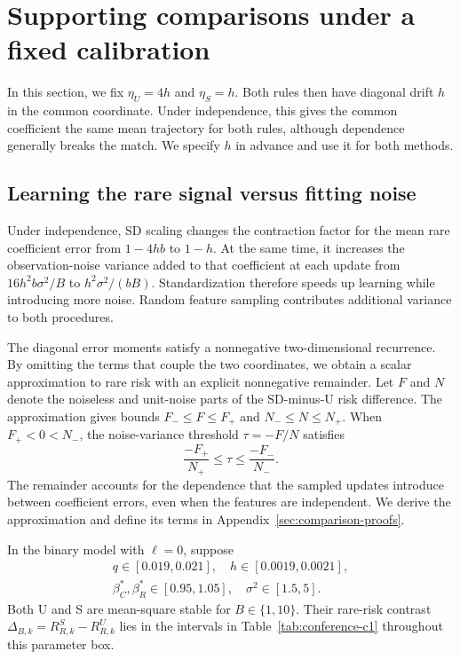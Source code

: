 \section{Supporting comparisons under a fixed calibration}
\label{sec:conference-comparisons}

In this section, we fix $\eta_U = 4h$ and $\eta_S = h$. Both rules then have
diagonal drift $h$ in the common coordinate. Under independence, this gives the
common coefficient the same mean trajectory for both rules, although dependence
generally breaks the match. We specify $h$ in advance and use it for both
methods.

\subsection{Learning the rare signal versus fitting noise}

Under independence, SD scaling changes the contraction factor for the mean rare
coefficient error from $1 - 4hb$ to $1 - h$. At the same time, it increases the
observation-noise variance added to that coefficient at each update from
$16h^2b\sigma^2/B$ to $h^2\sigma^2/(bB)$. Standardization therefore speeds up
learning while introducing more noise. Random feature sampling contributes
additional variance to both procedures.

The diagonal error moments satisfy a nonnegative two-dimensional recurrence. By
omitting the terms that couple the two coordinates, we obtain a scalar
approximation to rare risk with an explicit nonnegative remainder. Let $F$ and
$N$ denote the noiseless and unit-noise parts of the SD-minus-U risk difference.
The approximation gives bounds
$F_- \leq F \leq F_+$ and $N_- \leq N \leq N_+$. When $F_+ < 0 < N_-$, the
noise-variance threshold $\tau = -F/N$ satisfies
\begin{equation}
 \frac{-F_+}{N_+} \leq \tau
                  \leq \frac{-F_-}{N_-}. \label{eq:conference-threshold}
\end{equation}
The remainder accounts for the dependence that the sampled updates introduce
between coefficient errors, even when the features are independent. We derive
the approximation and define its terms in Appendix~\ref{sec:comparison-proofs}.

\begin{theorem}
 \label{thm:conference-c1}
 In the binary model with $\ell = 0$, suppose
 \begin{gather*}
  q \in[0.019,0.021] ,\quad h \in[0.0019,0.0021] ,               \\
  \beta_C^*,\beta_R^* \in[0.95,1.05] ,\quad\sigma^2 \in[1.5,5] .
 \end{gather*}
 Both U and S are mean-square stable for $B \in \{1,10\}$. Their rare-risk
 contrast $\Delta_{B,k} = R_{R,k}^S - R_{R,k}^U$ lies in the intervals in
 Table~\ref{tab:conference-c1} throughout this parameter box.
\end{theorem}

